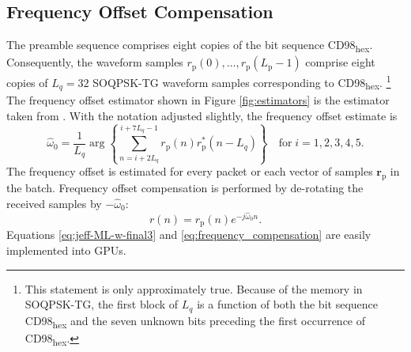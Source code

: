 \subsection{Frequency Offset Compensation}
\label{sec:freq_offset_comp}
The preamble sequence comprises eight copies of the bit sequence CD98\textsubscript{hex}.
Consequently, the waveform samples $r_\text{p}(0), \ldots , r_\text{p}(L_\text{p}-1)$ comprise 
eight copies of $L_q=32$ SOQPSK-TG waveform samples corresponding to CD98\textsubscript{hex}.%
\footnote{This statement is only approximately true. 
Because of the memory in SOQPSK-TG, the first block of $L_q$ is a function of both the bit sequence CD98\textsubscript{hex} and the seven unknown bits preceding the first occurrence of CD98\textsubscript{hex}.}
The frequency offset estimator shown in Figure \ref{fig:estimators} is the estimator taken from \cite[eq. (24)]{rice2014frequency}.
With the notation adjusted slightly, the frequency offset estimate is
\begin{equation}
	\hat{\omega}_0 = \frac{1}{L_q} \arg\left\{ \sum_{n=i+2L_q}^{i+7L_q-1} r_\text{p}(n)r_\text{p}^\ast(n-L_q)\right\}
	\quad
\text{for} \;
i=1,2,3,4,5.
	\label{eq:jeff-ML-w-final3}
\end{equation}
The frequency offset is estimated for every packet or each vector of samples $\mathbf{r}_\text{p}$ in the batch.
Frequency offset compensation is performed by de-rotating the received samples by $-\hat{\omega}_0$:
\begin{equation}
	r(n) = r_\text{p}(n) e^{-j\hat{\omega}_0n}.
	\label{eq:frequency_compensation}
\end{equation}
Equations \eqref{eq:jeff-ML-w-final3} and \eqref{eq:frequency_compensation} are easily implemented into GPUs. 

